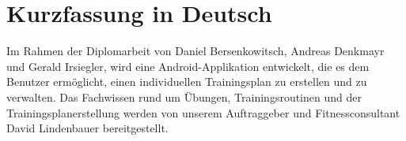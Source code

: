 \documentclass[FIPLY_base.tex]{subfiles}
\begin{document}

\section{Kurzfassung in Deutsch}
Im Rahmen der Diplomarbeit von Daniel Bersenkowitsch, Andreas Denkmayr und Gerald Irsiegler, wird eine Android-Applikation entwickelt, die es dem Benutzer ermöglicht, einen individuellen Trainingsplan zu erstellen und zu verwalten.
Das Fachwissen rund um Übungen, Trainingsroutinen und der Trainingsplanerstellung werden von unserem Auftraggeber und Fitnessconsultant David Lindenbauer bereitgestellt.
\end{document}
